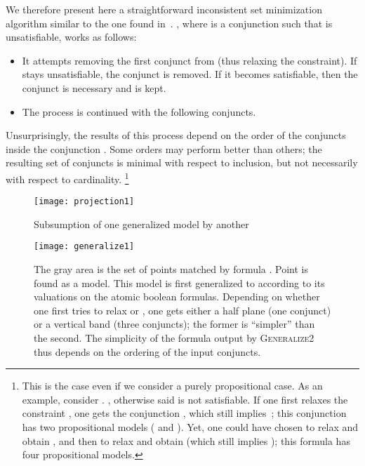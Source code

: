 We therefore present here a straightforward inconsistent set minimization algorithm similar to the one found in~\cite[\S6]{dMRS:CADE2002}.
, where  is a conjunction such that  is unsatisfiable, works as follows:
\begin{itemize}
\item
It attempts removing the first conjunct from  (thus relaxing the  constraint). If  stays unsatisfiable, the conjunct is removed. If it becomes satisfiable, then the conjunct is necessary and is kept.
\item The process is continued with the following conjuncts.
\end{itemize}

Unsurprisingly, the results of this process depend on the order of the conjuncts inside the conjunction . Some orders may perform better than others; the resulting set of conjuncts is minimal with respect to inclusion, but not necessarily with respect to cardinality.
\footnote{This is the case even if we consider a purely propositional case. As an example, consider . , otherwise said  is not satisfiable. If one first relaxes the constraint , one gets the conjunction , which still implies~; this conjunction has two propositional models ( and ). Yet, one could have chosen to relax  and obtain , and then to relax  and obtain  (which still implies ); this formula has four propositional models.}

\begin{figure}
\begin{center}
\texttt{[image: projection1]}
\end{center}
\caption{Subsumption of one generalized model by another}
\label{fig:projection1}
\end{figure}

\begin{figure}
\begin{center}
\texttt{[image: generalize1]}
\end{center}
\caption{The gray area is the set of points matched by formula . Point  is found as a model. This model is first generalized to  according to its valuations on the atomic boolean formulas. Depending on whether one first tries to relax  or , one gets either a half plane (one conjunct) or a vertical band (three conjuncts); the former is ``simpler'' than the second. The simplicity of the formula output by \textsc{Generalize2} thus depends on the ordering of the input conjuncts.}
\label{fig:generalize1}
\end{figure}

